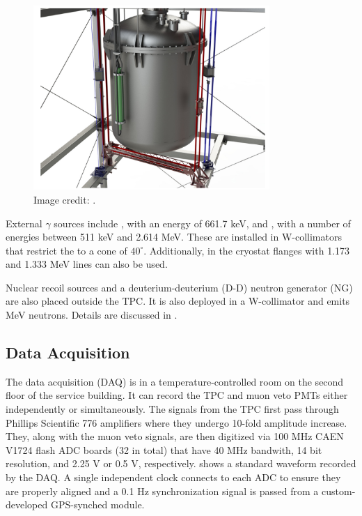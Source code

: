 \begin{figure}
\centering
\includegraphics[width=0.8\textwidth]{TPCCalibrations}
\caption{Image credit: .}
\label{fig:xenon1t_calibrations_belts}
\end{figure}

External $\gamma$ sources include , with an energy of 661.7 keV, and , with a number of energies between 511 keV
and 2.614 MeV.  These are installed in W-collimators that restrict the \gammarays to a cone of $40^{\circ}$.  Additionally, 
in the cryostat flanges with 1.173 and 1.333 MeV lines can also be used.

Nuclear recoil sources \ambe and a deuterium-deuterium (D-D) neutron generator (NG) are also placed outside the TPC.  It is also deployed in a
W-collimator and emits MeV neutrons.  Details are discussed in .



\subsection{Data Acquisition}
\label{subsec:xenon1t_daq}
The data acquisition (DAQ) is in a temperature-controlled room on the second floor of the service building.  It can record the TPC and
muon veto PMTs either independently or simultaneously.  The signals from the TPC first pass through Phillips Scientific 776 amplifiers
where they undergo 10-fold amplitude increase.  They, along with the muon veto signals, are then digitized via 100 MHz CAEN V1724 flash
ADC boards (32 in total) that have 40 MHz bandwith, 14 bit resolution, and 2.25 V or 0.5 V, respectively.  
shows a standard waveform recorded by the DAQ.  A single independent clock
connects to each ADC to ensure they are properly aligned and a 0.1 Hz synchronization signal is passed from a custom-developed GPS-synched
module.

